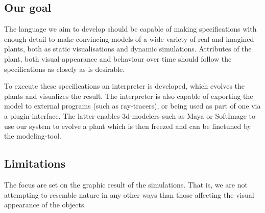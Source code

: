 \subsection{Our goal}

    The language we aim to develop should be capable of making
    specifications with enough detail to make convincing models of a
    wide variety of real and imagined plants, both as static
    visualisations and dynamic simulations.  Attributes of the plant,
    both visual appearance and behaviour over time should follow the
    specifications as closely as is desirable. 

    To execute these specifications an interpreter is developed, which
    evolves the plants and visualizes the result. The interpreter is
    also capable of exporting the model to external programs (such as
    ray-tracers), or being used as part of one via a plugin-interface.
    The latter enables 3d-modelers such as Maya or SoftImage to use
    our system to evolve a plant which is then freezed and can be
    finetuned by the modeling-tool.

\subsection{Limitations}

    \label{highlevel_limitations}    
    The focus are set on the graphic result of the simulations.
    That is, we are not attempting to resemble nature in any
    other ways than those affecting the visual appearance of the
    objects. 
